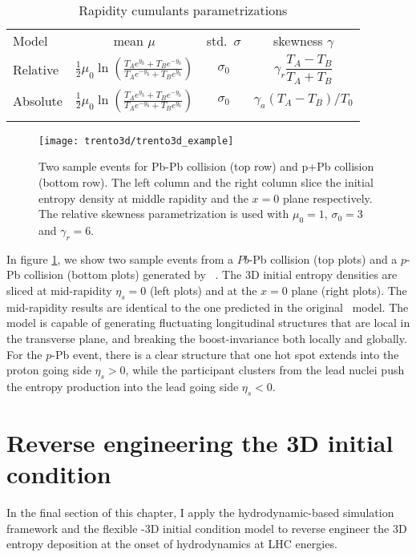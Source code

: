 \begin{table}
\centering
\caption{Rapidity cumulants parametrizations}\label{tab:parametrization}
\begin{tabular}{lccc}
\paddedhline
Model & mean $\mu$ & std.\ $\sigma$ & skewness $\gamma$ \\
\paddedhline \noalign{\smallskip}
Relative  & $\frac{1}{2} \mu_0 \ln\left(\frac{T_A e^{y_b}+T_B e^{-y_b}}{T_A e^{-y_b} + T_B e^{y_b}}\right)$ & $\sigma_0$ & $\gamma_r \dfrac{T_A - T_B}{T_A + T_B}$ \smallskip\\
Absolute & $\frac{1}{2} \mu_0 \ln\left(\frac{T_A e^{y_b}+T_B e^{-y_b}}{T_A e^{-y_b} + T_B e^{y_b}}\right)$  & $\sigma_0$ & $\gamma_a (T_A - T_B)/T_0$\smallskip\\
\paddedhline 
\end{tabular}
\end{table}

\begin{figure}
\singlespacing 
\centering
\texttt{[image: trento3d/trento3d\_example]}
\caption[Two sample events for Pb-Pb collision (top row) and p+Pb]{Two sample events for Pb-Pb collision (top row) and p+Pb collision (bottom row). The left column and the right column slice the initial entropy density at middle rapidity and the $x=0$ plane respectively. The relative skewness parametrization is used with $\mu_0=1$, $\sigma_0=3$ and $\gamma_r=6$.}
\label{fig:3d-example}
\end{figure}

In figure \ref{fig:3d-example}, we show two sample events from a $Pb$-Pb collision (top plots) and a $p$-Pb collision (bottom plots) generated by \trento\ .
The 3D initial entropy densities are sliced at mid-rapidity $\eta_s=0$ (left plots) and at the $x=0$ plane (right plots).
The mid-rapidity results are identical to the one predicted in the original \trento\ model.
The model is capable of generating fluctuating longitudinal structures that are local in the transverse plane, and breaking the boost-invariance both locally and globally.
For the $p$-Pb event, there is a clear structure that one hot spot extends into the proton going side $\eta_s >0$, while the participant clusters from the lead nuclei push the entropy production into the lead going side $\eta_s <0$.

\section{Reverse engineering the 3D initial condition}
In the final section of this chapter, I apply the hydrodynamic-based simulation framework and the flexible \trento-3D initial condition model to reverse engineer the 3D entropy deposition at the onset of hydrodynamics at LHC energies.

